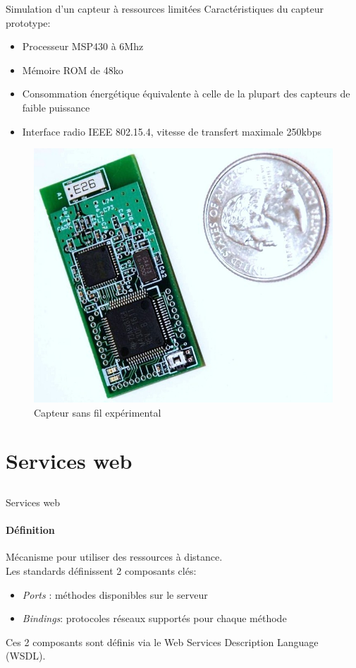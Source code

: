 \begin{frame}{Simulation d'un capteur à ressources limitées}
Caractéristiques du capteur prototype:
\begin{itemize}
\item Processeur MSP430 à \alert{6Mhz}
\item Mémoire ROM de \alert{48ko}
\item Consommation énergétique équivalente à celle de la plupart des capteurs de faible puissance
\item Interface radio IEEE 802.15.4, vitesse de transfert maximale 250kbps
\end{itemize}
\begin{figure}
  \centering
  \includegraphics[scale=0.15]{figures/tws08-000.jpg}
  \caption{Capteur sans fil expérimental}
 \end{figure} 
\end{frame}

\section{Services web}
\subsection{}
\begin{frame}{Services web}
\framesubtitle{Définition}
Mécanisme pour utiliser des ressources à distance.\\
Les standards définissent 2 composants clés:
\begin{itemize}
\item \textit{Ports} : méthodes disponibles sur le serveur  
\item \textit{Bindings}: protocoles réseaux supportés pour chaque méthode
\end{itemize}
Ces 2 composants sont définis via le Web Services Description Language (WSDL).%
\end{frame}

